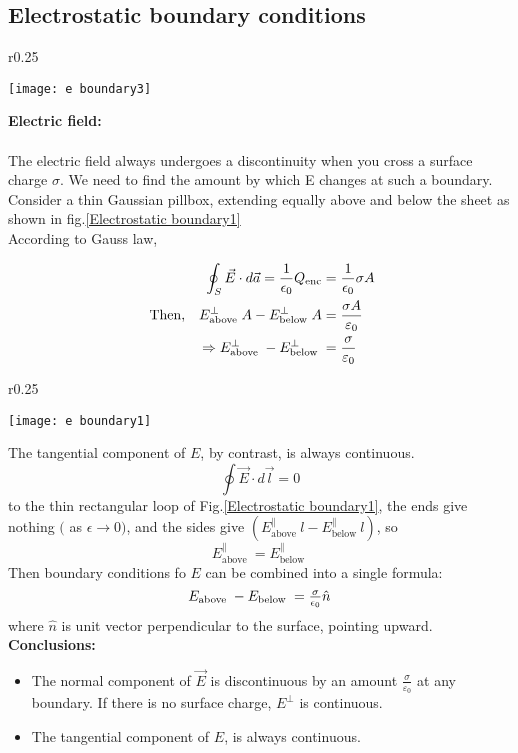 \subsection{Electrostatic boundary conditions}
\begin{wrapfigure}{r}{0.25\textwidth}
	\begin{center}
		\texttt{[image: e boundary3]}
	\end{center}
	\caption{Electrostatic boundary}
	\label{Electrostatic boundary1}
\end{wrapfigure}
\textbf{Electric field:}\\\\
The electric field always undergoes a discontinuity when you cross a surface charge $\sigma$. We need to find the amount by which E changes at such a boundary.\\Consider a thin Gaussian pillbox, extending equally above and below the sheet as shown in fig.\ref{Electrostatic boundary1} \\
According to Gauss law,

\begin{align}
\oint_{S} \vec{E} \cdot d \vec{a}=\frac{1}{\epsilon_{0}} Q_{\mathrm{enc}}
&=\frac{1}{\epsilon_{0}} \sigma A \notag\\
\text{\ Then,}\quad  E_{\text {above }}^{\perp} A-E_{\text {below }}^{\perp} A&=\frac{\sigma A}{\varepsilon_{0}}\notag \\
\Rightarrow E_{\text {above }}^{\perp}-E_{\text {below }}^{\perp}&=\frac{\sigma}{\varepsilon_{0}}
\end{align}

\begin{wrapfigure}{r}{0.25\textwidth}
	\begin{center}
		\texttt{[image: e boundary1]}
	\end{center}
	\caption{Electrostatics}
	\label{Electrostatics boundary 2}
\end{wrapfigure}

The tangential component of $E$, by contrast, is always continuous.
$$
\oint \vec{E} \cdot d \vec{l}=0
$$
to the thin rectangular loop of Fig.\ref{Electrostatic boundary1}, the ends give nothing $($ as $\epsilon \rightarrow 0)$, and the sides give $\left(E_{\text {above }}^{\|} l-E_{\text {below }}^{\|} l\right)$, so
$$
{E}_{\text {above }}^{\|}={E}_{\text {below }}^{\|}
$$
Then boundary conditions fo $E$ can be combined into a single formula:
\begin{equation}
$$
{E}_{\text {above }}-{E}_{\text {below }}=\frac{\sigma}{\epsilon_{0}} \hat{{n}}
$$
\end{equation}
where $\hat{n}$ is unit vector perpendicular to the surface, pointing upward.\\
\textbf{Conclusions:} 
\begin{itemize}
	\item The normal component of $\vec{E}$ is discontinuous by an amount $\frac{\sigma}{\varepsilon_{0}}$ at any boundary. If there is no surface charge, $E^{\perp}$ is continuous.
	\item The tangential component of $E$,  is always continuous.
\end{itemize}

